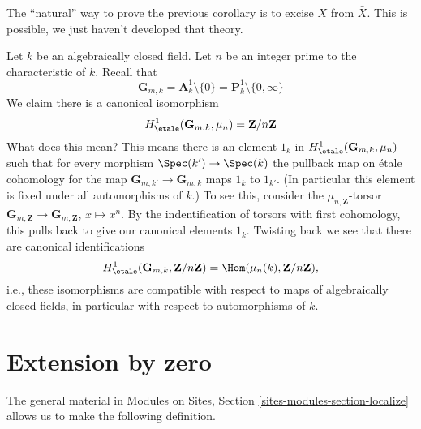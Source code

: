 \begin{remark}
\label{remark-natural-proof}
The ``natural'' way to prove the previous corollary is to excise $X$ from $\bar
X$. This is possible, we just haven't developed that theory.
\end{remark}

\begin{remark}
\label{remark-normalize-H1-Gm}
Let $k$ be an algebraically closed field. Let $n$ be an integer prime to
the characteristic of $k$. Recall that
$$
\mathbf{G}_{m, k} = \mathbf{A}^1_k \setminus \{0\} =
\mathbf{P}^1_k \setminus \{0, \infty\}
$$
We claim there is a canonical isomorphism
$$
H^1_\etale(\mathbf{G}_{m, k}, \mu_n) = \mathbf{Z}/n\mathbf{Z}
$$
What does this mean? This means there is an element $1_k$ in
$H^1_\etale(\mathbf{G}_{m, k}, \mu_n)$ such that for
every morphism $\Spec(k') \to \Spec(k)$ the pullback map on
\'etale cohomology for the map $\mathbf{G}_{m, k'} \to \mathbf{G}_{m, k}$
maps $1_k$ to $1_{k'}$. (In particular this element is
fixed under all automorphisms of $k$.) To see this, consider the
$\mu_{n, \mathbf{Z}}$-torsor
$\mathbf{G}_{m, \mathbf{Z}} \to \mathbf{G}_{m, \mathbf{Z}}$,
$x \mapsto x^n$. By the indentification of torsors with
first cohomology, this pulls back to give our canonical elements $1_k$.
Twisting back we see that there are canonical identifications
$$
H^1_\etale(\mathbf{G}_{m, k}, \mathbf{Z}/n\mathbf{Z}) =
\Hom(\mu_n(k), \mathbf{Z}/n\mathbf{Z}),
$$
i.e., these isomorphisms are compatible with respect to maps of
algebraically closed fields, in particular with respect to
automorphisms of $k$.
\end{remark}










\section{Extension by zero}
\label{section-extension-by-zero}

\noindent
The general material in
Modules on Sites, Section \ref{sites-modules-section-localize}
allows us to make the following definition.

